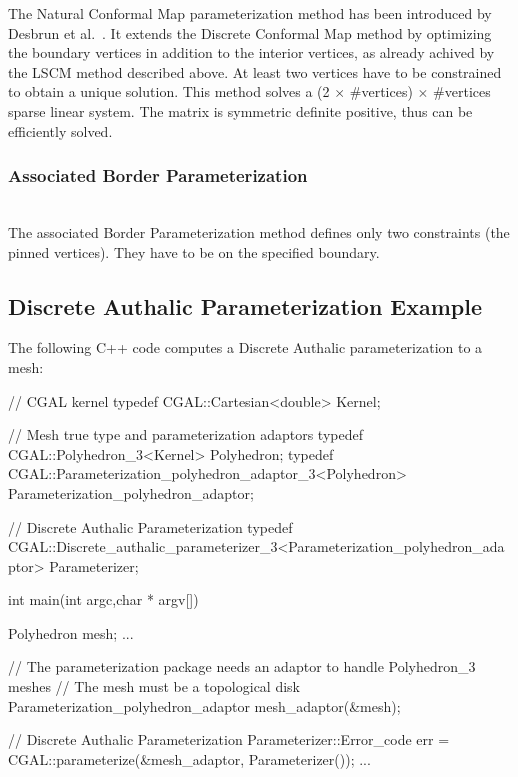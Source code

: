 The Natural Conformal Map parameterization method has been introduced
by Desbrun et al.~\cite{cgal:dma-ipsm-02}. It extends the Discrete
Conformal Map method by optimizing the boundary vertices in addition
to the interior vertices, as already achived by the LSCM method
described above. At least two vertices have to be constrained to
obtain a unique solution. This method solves a (2 $\times$ \#vertices) $\times$
\#vertices sparse linear system.  The matrix is symmetric definite
positive, thus can be efficiently solved.



\subsubsection{Associated Border Parameterization}

  \\

The associated Border Parameterization method defines only two constraints
(the pinned vertices). They have to be on the specified boundary.


\subsection{Discrete Authalic Parameterization Example}

The following C++ code computes a Discrete Authalic parameterization
to a  mesh:

\begin{ccExampleCode}

// CGAL kernel
typedef CGAL::Cartesian<double>                         Kernel;

// Mesh true type and parameterization adaptors
typedef CGAL::Polyhedron_3<Kernel>                      Polyhedron;
typedef CGAL::Parameterization_polyhedron_adaptor_3<Polyhedron>
                                                        Parameterization_polyhedron_adaptor;

// Discrete Authalic Parameterization
typedef CGAL::Discrete_authalic_parameterizer_3<Parameterization_polyhedron_adaptor>
                                                        Parameterizer;

int main(int argc,char * argv[])
{
    Polyhedron mesh;
    ...

    // The parameterization package needs an adaptor to handle Polyhedron_3 meshes
    // The mesh must be a topological disk
    Parameterization_polyhedron_adaptor mesh_adaptor(&mesh);

    // Discrete Authalic Parameterization
    Parameterizer::Error_code err = CGAL::parameterize(&mesh_adaptor, Parameterizer());
    ...
}

\end{ccExampleCode}


